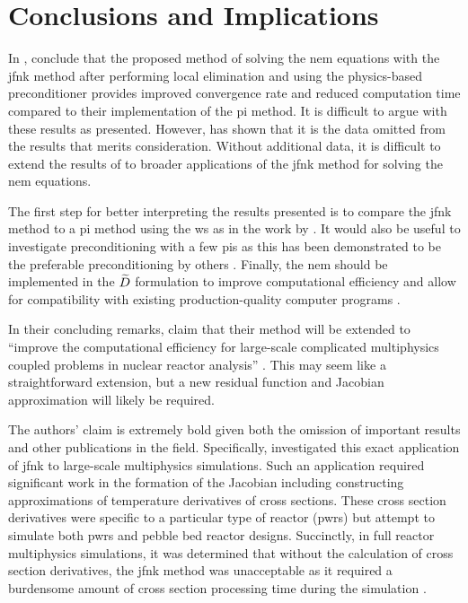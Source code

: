 \section{Conclusions and Implications}
\label{sec:conclusion}

  In , \citeauthor{qe2paper} conclude that the proposed
  method of solving the \gls{nem} equations with the \gls{jfnk} method after
  performing local elimination and using the physics-based preconditioner
  provides improved convergence rate and reduced computation time compared to
  their implementation of the \gls{pi} method. It is difficult to argue with
  these results as presented. However,  has shown that it is
  the data omitted from the results that merits consideration. Without
  additional data, it is difficult to extend the results of
  \citeauthor{qe2paper} to broader applications of the \gls{jfnk} method for
  solving the \gls{nem} equations.

  The first step for better interpreting the results presented is to compare the
  \gls{jfnk} method to a \gls{pi} method using the \gls{ws} as in the work by
  \citeauthor{jfnk_wielandt}. It would also be useful to investigate
  preconditioning with a few \glspl{pi} as this has been demonstrated to be the
  preferable preconditioning by others \cite{gill_azmy,jfnk_wielandt}. Finally,
  the \gls{nem} should be implemented in the $\widetilde{D}$ formulation to improve
  computational efficiency and allow for compatibility with existing
  production-quality computer programs \cite{palmtagThesis,smith_nonlinear}.

  In their concluding remarks, \citeauthor{qe2paper} claim that their method
  will be extended to ``improve the computational efficiency for large-scale
  complicated multiphysics coupled problems in nuclear reactor analysis''
  \cite{qe2paper}. This may seem like a straightforward extension, but a new
  residual function and Jacobian approximation will likely be required.

  The authors' claim is extremely bold given both the omission of important
  results and other publications in the field. Specifically,
  \citeauthor{caslJFNK} investigated this exact application of \gls{jfnk} to
  large-scale multiphysics simulations. Such an application required significant
  work in the formation of the Jacobian including constructing approximations of
  temperature derivatives of cross sections. These cross section derivatives
  were specific to a particular type of reactor (\glspl{pwr}) but
  \citeauthor{qe2paper} attempt to simulate both \glspl{pwr} and pebble bed
  reactor designs. Succinctly, in full reactor multiphysics simulations, it was
  determined that without the calculation of cross section derivatives, the
  \gls{jfnk} method was unacceptable as it required a burdensome amount of cross
  section processing time during the simulation \cite{caslJFNK}.

